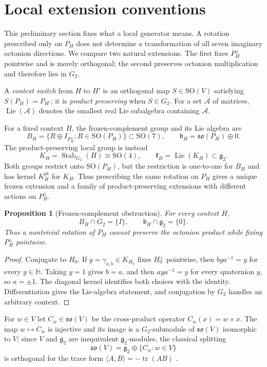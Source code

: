 \documentclass[11pt,a4paper]{article}
\newtheorem{proposition}[proposition]{Proposition}
\newcommand{\HH}{\mathbb H}
\newcommand{\Gtwo}{G_2}
\newcommand{\gtwo}{\mathfrak g_2}
\newcommand{\SO}{\mathrm{SO}}
\newcommand{\Stab}{\operatorname{Stab}}
\newcommand{\Lie}{\operatorname{Lie}}
\begin{document}
\section{Local extension conventions}
\label{sec:models}

This preliminary section fixes what a local generator means.  A rotation prescribed only on $P_H$ does not determine a transformation of all seven imaginary octonion directions.  We compare two natural extensions.  The first fixes $P_H^\perp$ pointwise and is merely orthogonal; the second preserves octonion multiplication and therefore lies in $G_2$.

A \emph{context switch} from $H$ to $H'$ is an orthogonal map $S\in\SO(V)$ satisfying $S(P_H)=P_{H'}$; it is \emph{product preserving} when $S\in G_2$.  For a set $\mathcal A$ of matrices, $\Lie(\mathcal A)$ denotes the smallest real Lie subalgebra containing $\mathcal A$.

For a fixed context $H$, the frozen-complement group and its Lie algebra are
\[
B_H=\{R\oplus I_{P_H^\perp}:R\in\SO(P_H)\}\subset\SO(7),
\qquad
\mathfrak b_H=\mathfrak{so}(P_H)\oplus0.
\]
The product-preserving local group is instead
\[
K_H=\Stab_{G_2}(H)\cong\SO(4),
\qquad
\mathfrak k_H=\operatorname{Lie}(K_H)\subset\mathfrak g_2.
\]
Both groups restrict onto $\SO(P_H)$, but the restriction is one-to-one for $B_H$ and has kernel $K_H^{\mathrm{pt}}$ for $K_H$.  Thus prescribing the same rotation on $P_H$ gives a unique frozen extension and a family of product-preserving extensions with different actions on $P_H^\perp$.

\begin{proposition}[Frozen-complement obstruction]
\label{prop:frozen}
For every context $H$,
\[
B_H\cap G_2=\{I\},\qquad
\mathfrak b_H\cap\mathfrak g_2=\{0\}.
\]
Thus a nontrivial rotation of $P_H$ cannot preserve the octonion product while fixing $P_H^\perp$ pointwise.
\end{proposition}

\begin{proof}
Conjugate to $H_0$.  If $g=\gamma_{a,b}\in K_{H_0}$ fixes $H_0^\perp$ pointwise, then $bya^{-1}=y$ for every $y\in\HH$.  Taking $y=1$ gives $b=a$, and then $aya^{-1}=y$ for every quaternion $y$, so $a=\pm1$.  The diagonal kernel identifies both choices with the identity.  Differentiation gives the Lie-algebra statement, and conjugation by $G_2$ handles an arbitrary context.
\end{proof}

For $w\in V$ let $C_w\in\mathfrak{so}(V)$ be the cross-product operator
$C_w(x)=w\times x$.  The map $w\mapsto C_w$ is injective and its image is a
$\Gtwo$-submodule of $\mathfrak{so}(V)$ isomorphic to $V$; since $V$ and
$\gtwo$ are inequivalent $\gtwo$-modules, the classical splitting
\begin{equation}
\mathfrak{so}(V)=\gtwo\oplus\{C_w:w\in V\}
\label{eq:so7split}
\end{equation}
is orthogonal for the trace form $\langle A,B\rangle=-\operatorname{tr}(AB)$ \cite{ChemtovKarigiannis2022}.
\end{document}
